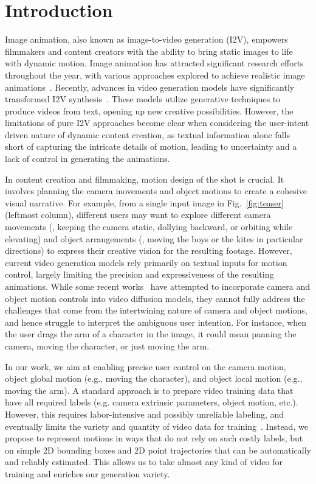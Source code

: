 \section{Introduction}
\label{sec-1-intro}

Image animation, also known as image-to-video generation (I2V), empowers filmmakers and content creators with the ability to bring static images to life with dynamic motion. Image animation has attracted significant research efforts throughout the year, with various approaches explored to achieve realistic image animations~\cite{horrytour, xuanimating,liuinfinite, holynski2021animating}.
Recently, advances in video generation models have significantly transformed I2V synthesis~\cite{xing2023dynamicrafter,yang2024cogvideox}. These models utilize generative techniques to produce videos from text, opening up new creative possibilities. However, the limitations of pure I2V approaches become clear when considering the user-intent driven nature of dynamic content creation, as textual information alone falls short of capturing the intricate details of motion, leading to uncertainty and a lack of control in generating the animations.

In content creation and filmmaking, motion design of the shot is crucial. It involves planning the camera movements and object motions to create a cohesive visual narrative. 
For example, from a single input image in Fig.~\ref{fig:teaser} (leftmost column), different users may want to explore different camera movements (\eg, keeping the camera static, dollying backward, or orbiting while elevating) and object arrangements (\eg, moving the boys or the kites in particular directions)
to express their creative vision for the resulting footage.
However, current video generation models rely primarily on textual inputs for motion control, largely limiting the precision and expressiveness of the resulting animations. While some recent works~\cite{wang2024motionctrl,wu2025draganything} have attempted to incorporate camera and object motion controls into video diffusion models, they cannot fully address the challenges that come from the intertwining nature of camera and object motions, and hence struggle to interpret the ambiguous user intention. For instance, when the user drags the arm of a character in the image, it could mean panning the camera, moving the character, or just moving the arm.



In our work, we aim at enabling precise user control on the camera motion, object global motion (e.g., moving the character), and object local motion (e.g., moving the arm). A standard approach is to prepare video training data that have all required labels (e.g. camera extrinsic parameters, object motion, etc.). 
However, this requires labor-intensive and possibly unreliable labeling, and eventually limits the variety and quantity of video data for training~\cite{wang2024motionctrl,he2024cameractrl}. Instead, we propose to represent motions in ways that do not rely on such costly labels, but on simple 2D bounding boxes and 2D point trajectories that can be automatically and reliably estimated. This allows us to take almost any kind of video for training and enriches our generation variety. 

